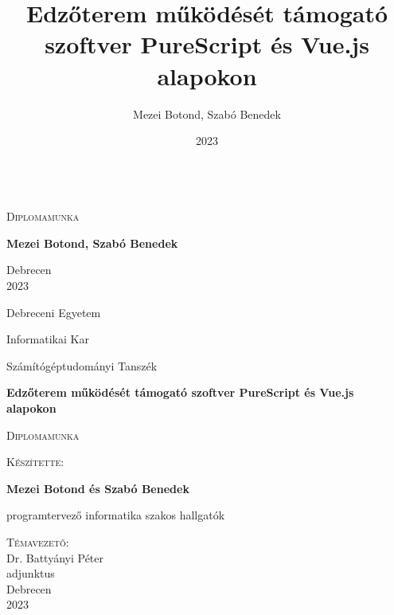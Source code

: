 \documentclass[12pt]{article}
\title{Edzőterem működését támogató szoftver PureScript és Vue.js alapokon}
\author{Mezei Botond, Szabó Benedek}
\date{2023}
\begin{document}
\begin{titlepage}

	\begin{center}
	\mbox{}\\
	\vspace{35mm}
	\huge
	\textsc{Diplomamunka}
	\end{center}

	
	\vspace{55mm}
	\Large
	\hspace*{\fill} 
	\textbf{Mezei Botond, Szabó Benedek}
	
	\begin{center}
	\vspace{55mm}
	Debrecen\\	
	2023
	
	\end{center}
\end{titlepage}
\begin{titlepage}

	\vspace*{-2cm}
	\hspace*{-1.5cm}

	\begin{center}
	\large
	Debreceni Egyetem
	
	Informatikai Kar	

	Számítógéptudományi Tanszék
	
	\vspace{17mm}
	\huge
	\LARGE
    \textbf{Edzőterem működését támogató szoftver PureScript és Vue.js alapokon}
	
	\vspace{15mm}
	\large
	\textsc{Diplomamunka}
	
	\normalsize
	\vspace{17mm}
	\textsc{Készítette:}
	
	\vspace{5mm}
	\Large
	\textbf{Mezei Botond és Szabó Benedek}
	
	\normalsize
	programtervező informatika szakos hallgatók
	
	\vspace{18mm}
	\textsc{Témavezető:}\\
	\vspace{5mm}
	\large
	Dr. Battyányi Péter \\
	\normalsize
	adjunktus\\
	
	\vspace{27mm}
	Debrecen\\	
	2023
	
	\end{center}
\end{titlepage}
\newpage
\tableofcontents
\newpage
\end{document}
